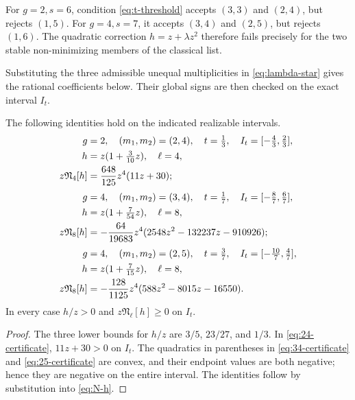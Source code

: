 For \(g=2,s=6\), condition \eqref{eq:t-threshold} accepts
\((3,3)\) and \((2,4)\), but rejects \((1,5)\).  For \(g=4,s=7\), it
accepts \((3,4)\) and \((2,5)\), but rejects \((1,6)\).
The quadratic correction \(h=z+\lambda z^2\) therefore fails
precisely for the two stable non-minimizing members of the classical
list.

Substituting the three admissible unequal multiplicities in
\eqref{eq:lambda-star} gives the rational coefficients below.
Their global signs are then checked on the exact interval $I_t$.

\begin{proposition}
\label{prop:quadratic-corrections}
The following identities hold on the indicated realizable intervals.
\begin{align}
g&=2,\quad (m_1,m_2)=(2,4),\quad
t=\tfrac13,\quad I_t=[-\tfrac43,\tfrac23],\notag\\
h&=z(1+\tfrac3{10}z),\quad \ell=4,\notag\\
z\mathfrak N_4[h]
&=\frac{648}{125}z^4(11z+30);                    \label{eq:24-certificate}\\[1mm]
g&=4,\quad (m_1,m_2)=(3,4),\quad
t=\tfrac17,\quad I_t=[-\tfrac87,\tfrac67],\notag\\
h&=z(1+\tfrac7{54}z),\quad \ell=8,\notag\\
z\mathfrak N_8[h]
&=-\frac{64}{19683}z^4
 (2548z^2-132237z-910926);                       \label{eq:34-certificate}\\[1mm]
g&=4,\quad (m_1,m_2)=(2,5),\quad
t=\tfrac37,\quad I_t=[-\tfrac{10}7,\tfrac47],\notag\\
h&=z(1+\tfrac7{15}z),\quad \ell=8,\notag\\
z\mathfrak N_8[h]
&=-\frac{128}{1125}z^4
 (588z^2-8015z-16550).                            \label{eq:25-certificate}
\end{align}
In every case \(h/z>0\) and \(z\mathfrak N_\ell[h]\geq0\) on \(I_t\).
\end{proposition}

\begin{proof}
The three lower bounds for \(h/z\) are \(3/5\), \(23/27\), and
\(1/3\).  In \eqref{eq:24-certificate}, \(11z+30>0\) on \(I_t\).
The quadratics in parentheses in \eqref{eq:34-certificate} and
\eqref{eq:25-certificate} are convex, and their endpoint values are both
negative; hence they are negative on the entire interval.  The identities
follow by substitution into \eqref{eq:N-h}.
\end{proof}

